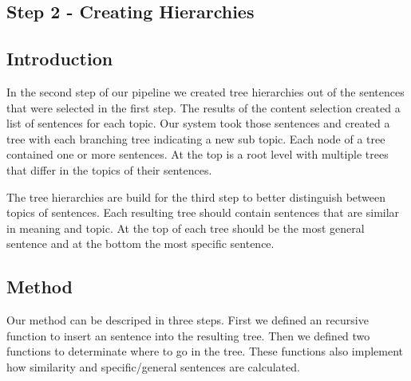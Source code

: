 




\subsection{Step 2 - Creating Hierarchies}

\subsection{Introduction}

In the second step of our pipeline we created tree hierarchies out of the sentences that were selected in the first step. The results of the content selection created a list of sentences for each topic. Our system took those sentences and created a tree with each branching tree indicating a new sub topic. Each node of a tree contained one or more sentences. At the top is a root level with multiple trees that differ in the topics of their sentences. 

The tree hierarchies are build for the third step to better distinguish between topics of sentences. Each resulting tree should contain sentences that are similar in meaning and topic. At the top of each tree should be the most general sentence and at the bottom the most specific sentence.


\subsection{Method}

Our method can be descriped in three steps. First we defined an recursive function to insert an sentence into the resulting tree. Then we defined two functions to determinate where to go in the tree. These functions also implement how similarity and specific/general sentences are calculated.

